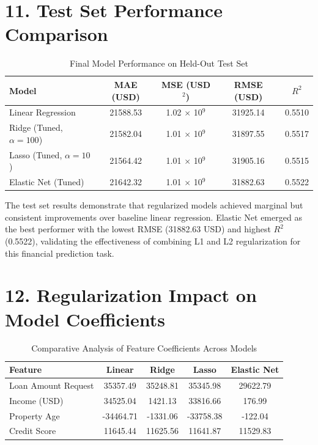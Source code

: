 \documentclass[11pt]{article}
\begin{document}
\section*{11. Test Set Performance Comparison}
\begin{table}[H]
\centering
\renewcommand{\arraystretch}{1.3}
\caption{Final Model Performance on Held-Out Test Set}
\begin{tabular}{|l|c|c|c|c|}
\hline
Model & MAE (USD) & MSE (USD$^2$) & RMSE (USD) & $R^2$ \\ \hline
Linear Regression & 21588.53 & 1.02 $\times$ 10$^9$ & 31925.14 & 0.5510 \\
Ridge (Tuned, $\alpha=100$) & 21582.04 & 1.01 $\times$ 10$^9$ & 31897.55 & 0.5517 \\
Lasso (Tuned, $\alpha=10$) & 21564.42 & 1.01 $\times$ 10$^9$ & 31905.16 & 0.5515 \\
Elastic Net (Tuned) & 21642.32 & 1.01 $\times$ 10$^9$ & 31882.63 & 0.5522 \\ \hline
\end{tabular}
\end{table}

The test set results demonstrate that regularized models achieved marginal but consistent improvements over baseline linear regression. Elastic Net emerged as the best performer with the lowest RMSE (31882.63 USD) and highest $R^2$ (0.5522), validating the effectiveness of combining L1 and L2 regularization for this financial prediction task.

\section*{12. Regularization Impact on Model Coefficients}
\begin{table}[H]
\centering
\renewcommand{\arraystretch}{1.3}
\caption{Comparative Analysis of Feature Coefficients Across Models}
\begin{tabular}{|l|c|c|c|c|}
\hline
Feature & Linear & Ridge & Lasso & Elastic Net \\ \hline
Loan Amount Request & 35357.49 & 35248.81 & 35345.98 & 29622.79 \\
Income (USD) & 34525.04 & 1421.13 & 33816.66 & 176.99 \\
Property Age & -34464.71 & -1331.06 & -33758.38 & -122.04 \\
Credit Score & 11645.44 & 11625.56 & 11641.87 & 11529.83 \\ \hline
\end{tabular}
\end{table}
\end{document}
